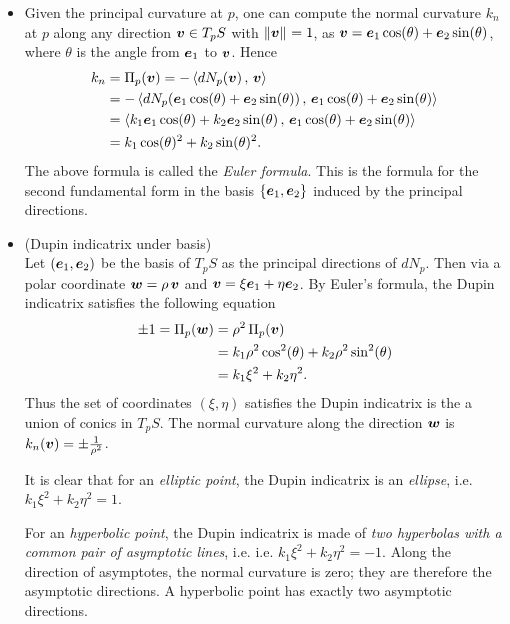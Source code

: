 \documentclass[11pt]{article}
\begin{document}
\begin{itemize}
\item Given the principal curvature at $p$, one can compute the normal curvature $k_{n}$ at $p$ along any direction $\boldsymbol{v}\in T_{p}S$ with $\left\|\boldsymbol{v}\right\|_{} = 1$, as $\boldsymbol{v} = \boldsymbol{e}_{1}\cos(\theta) + \boldsymbol{e}_{2}\sin(\theta)$, where $\theta$ is the angle from $\boldsymbol{e}_{1}$ to $\boldsymbol{v}$. Hence
\begin{align}
k_{n} &= \Pi_{p}(\boldsymbol{v}) = -\left\langle dN_{p}(\boldsymbol{v})\,,\, \boldsymbol{v} \right\rangle\nonumber\\
&= -\left\langle dN_{p}( \boldsymbol{e}_{1}\cos(\theta) + \boldsymbol{e}_{2}\sin(\theta))\,,\,  \boldsymbol{e}_{1}\cos(\theta) + \boldsymbol{e}_{2}\sin(\theta) \right\rangle\nonumber\\
&= \left\langle k_{1}\boldsymbol{e}_{1}\cos(\theta) + k_{2}\boldsymbol{e}_{2}\sin(\theta)\,,\, \boldsymbol{e}_{1}\cos(\theta) + \boldsymbol{e}_{2}\sin(\theta) \right\rangle\nonumber\\
&= k_{1}\cos(\theta)^{2} + k_{2}\sin(\theta)^{2}. \label{eqn: Euler_formula}
\end{align}
The above formula is called the \emph{Euler formula}. This is the formula for the second fundamental form in the basis $\left\{\boldsymbol{e}_{1}, \boldsymbol{e}_{2}\right\}$ induced by the principal directions. 

\item  (Dupin indicatrix under basis)\\
Let $(\boldsymbol{e}_{1}, \boldsymbol{e}_{2})$ be the basis of $T_{p}S$ as the principal directions of $dN_{p}$. Then via a polar coordinate $\boldsymbol{w} = \rho\,\boldsymbol{v}$ and $\boldsymbol{v} = \xi\boldsymbol{e}_{1}+ \eta\boldsymbol{e}_{2}$. By Euler's formula, the Dupin indicatrix satisfies the following equation
 \begin{align*}
 \pm 1 = \Pi_{p}(\boldsymbol{w}) &= \rho^{2}\,\Pi_{p}(\boldsymbol{v})\\
 &= k_{1}\rho^{2}\cos^{2}(\theta) + k_{2}\rho^{2}\sin^{2}(\theta) \\
 &= k_{1}\xi^{2} + k_{2}\eta^{2}.
 \end{align*}
Thus the set of coordinates $(\xi, \eta)$ satisfies the Dupin indicatrix is the a union of conics in $T_{p}S$. The normal curvature along the direction $\boldsymbol{w}$ is $k_{n}(\boldsymbol{v}) = \pm \frac{1}{\rho^{2}}$.

It is clear that for an \emph{elliptic point}, the Dupin indicatrix is an \emph{ellipse}, i.e. $k_{1}\xi^{2} + k_{2}\eta^{2} = 1$. 

For an \emph{hyperbolic point}, the Dupin indicatrix is made of \emph{two hyperbolas with a common pair of asymptotic lines}, i.e. i.e. $k_{1}\xi^{2} + k_{2}\eta^{2} = -1$. Along the direction of asymptotes, the normal curvature is zero; they are therefore the asymptotic directions. A hyperbolic point has exactly two asymptotic directions.  


\end{itemize}
\end{document}
